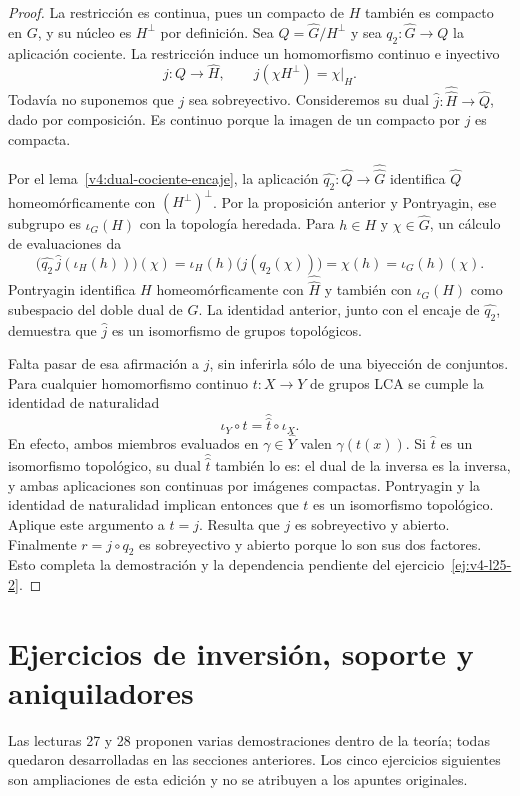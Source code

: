 \begin{proof}
La restricción es continua, pues un compacto de $H$ también es compacto en $G$, y su núcleo es $H^\perp$ por definición. Sea $Q=\widehat G/H^\perp$ y sea $q_2:\widehat G\to Q$ la aplicación cociente. La restricción induce un homomorfismo continuo e inyectivo
\[
 j:Q\longrightarrow\widehat H,
 \qquad j(\chi H^\perp)=\chi|_H.
\]
Todavía no suponemos que $j$ sea sobreyectivo. Consideremos su dual
$\widehat j:\widehat{\widehat H}\to\widehat Q$, dado por composición. Es continuo porque la imagen de un compacto por $j$ es compacta.

Por el lema~\ref{v4:dual-cociente-encaje}, la aplicación $\widehat{q_2}:\widehat Q\to\widehat{\widehat G}$ identifica $\widehat Q$ homeomórficamente con $(H^\perp)^\perp$. Por la proposición anterior y Pontryagin, ese subgrupo es $\iota_G(H)$ con la topología heredada. Para $h\in H$ y $\chi\in\widehat G$, un cálculo de evaluaciones da
\[
 \bigl(\widehat{q_2}\,\widehat j(\iota_H(h))\bigr)(\chi)
 =\iota_H(h)\bigl(j(q_2(\chi))\bigr)
 =\chi(h)=\iota_G(h)(\chi).
\]
Pontryagin identifica $H$ homeomórficamente con $\widehat{\widehat H}$ y también con $\iota_G(H)$ como subespacio del doble dual de $G$. La identidad anterior, junto con el encaje de $\widehat{q_2}$, demuestra que $\widehat j$ es un isomorfismo de grupos topológicos.

Falta pasar de esa afirmación a $j$, sin inferirla sólo de una biyección de conjuntos. Para cualquier homomorfismo continuo $t:X\to Y$ de grupos LCA se cumple la identidad de naturalidad
\[
 \iota_Y\circ t=\widehat{\widehat t}\circ\iota_X.
\]
En efecto, ambos miembros evaluados en $\gamma\in\widehat Y$ valen $\gamma(t(x))$. Si $\widehat t$ es un isomorfismo topológico, su dual $\widehat{\widehat t}$ también lo es: el dual de la inversa es la inversa, y ambas aplicaciones son continuas por imágenes compactas. Pontryagin y la identidad de naturalidad implican entonces que $t$ es un isomorfismo topológico. Aplique este argumento a $t=j$. Resulta que $j$ es sobreyectivo y abierto. Finalmente $r=j\circ q_2$ es sobreyectivo y abierto porque lo son sus dos factores. Esto completa la demostración y la dependencia pendiente del ejercicio~\ref{ej:v4-l25-2}.
\end{proof}

\section{Ejercicios de inversión, soporte y aniquiladores}
Las lecturas 27 y 28 proponen varias demostraciones dentro de la teoría; todas quedaron desarrolladas en las secciones anteriores. Los cinco ejercicios siguientes son ampliaciones de esta edición y no se atribuyen a los apuntes originales.


